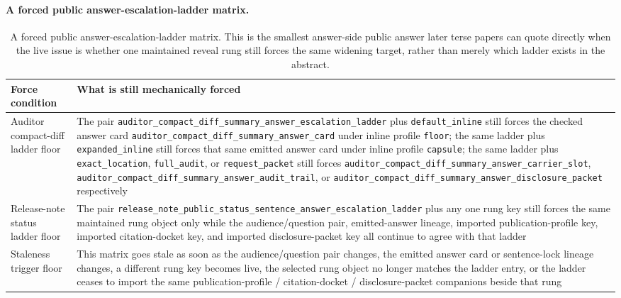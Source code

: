 \documentclass[11pt]{article}
\begin{document}
\paragraph{A forced public answer-escalation-ladder matrix.}
\begin{table}[t]
\centering
\small
\begin{tabularx}{\linewidth}{@{}LY@{}}
\toprule
Force condition & What is still mechanically forced \\
\midrule
Auditor compact-diff ladder floor & The pair \nolinkurl{auditor_compact_diff_summary_answer_escalation_ladder} plus \nolinkurl{default_inline} still forces the checked answer card \nolinkurl{auditor_compact_diff_summary_answer_card} under inline profile \nolinkurl{floor}; the same ladder plus \nolinkurl{expanded_inline} still forces that same emitted answer card under inline profile \nolinkurl{capsule}; the same ladder plus \nolinkurl{exact_location}, \nolinkurl{full_audit}, or \nolinkurl{request_packet} still forces \nolinkurl{auditor_compact_diff_summary_answer_carrier_slot}, \nolinkurl{auditor_compact_diff_summary_answer_audit_trail}, or \nolinkurl{auditor_compact_diff_summary_answer_disclosure_packet} respectively \\
Release-note status ladder floor & The pair \nolinkurl{release_note_public_status_sentence_answer_escalation_ladder} plus any one rung key still forces the same maintained rung object only while the audience/question pair, emitted-answer lineage, imported publication-profile key, imported citation-docket key, and imported disclosure-packet key all continue to agree with that ladder \\
Staleness trigger floor & This matrix goes stale as soon as the audience/question pair changes, the emitted answer card or sentence-lock lineage changes, a different rung key becomes live, the selected rung object no longer matches the ladder entry, or the ladder ceases to import the same publication-profile / citation-docket / disclosure-packet companions beside that rung \\
\bottomrule
\end{tabularx}
\caption{A forced public answer-escalation-ladder matrix. This is the smallest answer-side public answer later terse papers can quote directly when the live issue is whether one maintained reveal rung still forces the same widening target, rather than merely which ladder exists in the abstract.}
\label{tab:forced-public-answer-escalation-ladder-matrix}
\end{table}
\end{document}
